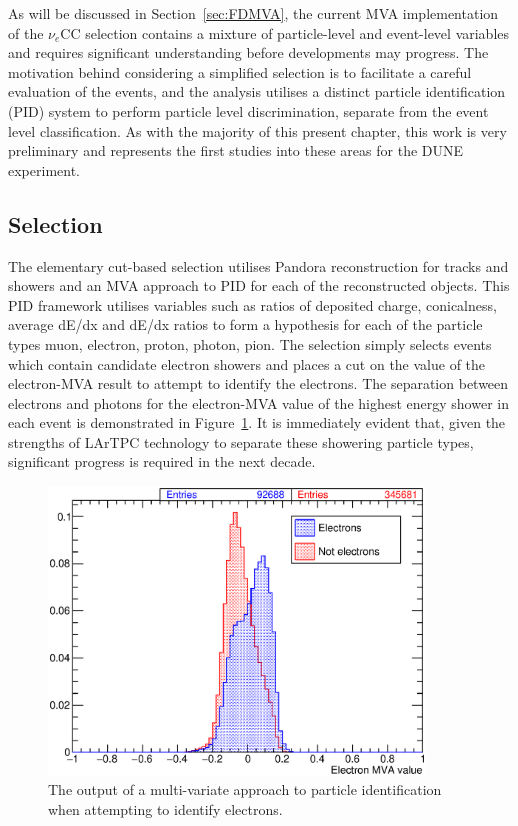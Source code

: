 As will be discussed in Section~\ref{sec:FDMVA}, the current MVA implementation of the $\nu_e$CC selection contains a mixture of particle-level and event-level variables and requires significant understanding before developments may progress.  The motivation behind considering a simplified selection is to facilitate a careful evaluation of the events, and the analysis utilises a distinct particle identification (PID) system to perform particle level discrimination, separate from the event level classification.  As with the majority of this present chapter, this work is very preliminary and represents the first studies into these areas for the DUNE experiment.

\subsection{Selection}\label{sec:FDCutSelection}

The elementary cut-based selection utilises Pandora reconstruction for tracks and showers and an MVA approach to PID for each of the reconstructed objects.  This PID framework \cite{GrantPID2016} utilises variables such as ratios of deposited charge, conicalness, average dE/dx and dE/dx ratios to form a hypothesis for each of the particle types muon, electron, proton, photon, pion.  The selection simply selects events which contain candidate electron showers and places a cut on the value of the electron-MVA result to attempt to identify the electrons.  The separation between electrons and photons for the electron-MVA value of the highest energy shower in each event is demonstrated in Figure~\ref{fig:ElectronMVA}.  It is immediately evident that, given the strengths of LArTPC technology to separate these showering particle types, significant progress is required in the next decade.

\begin{figure}
  \centering
  \includegraphics[width=10cm]{ElectronMVA.eps}
  \caption[The output of a multi-variate approach to particle identification when attempting to identify electrons.]{The output of a multi-variate approach to particle identification when attempting to identify electrons.}
  \label{fig:ElectronMVA}
\end{figure}

